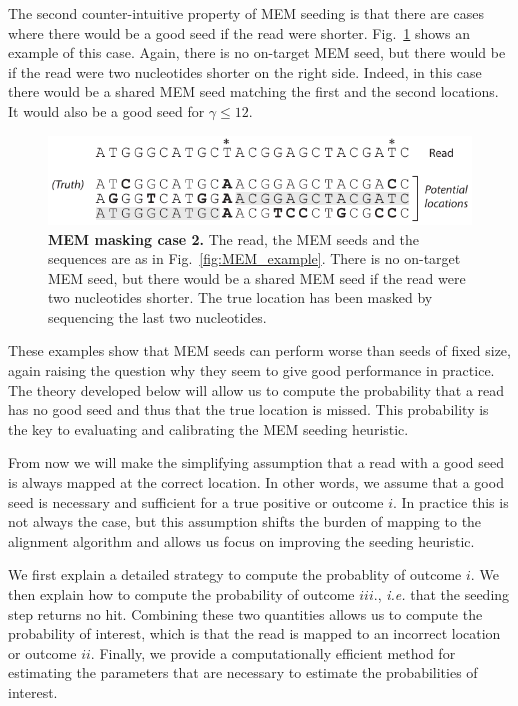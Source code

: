 \documentclass{article}
\begin{document}
The second counter-intuitive property of MEM seeding is that there are
cases where there would be a good seed if the read were shorter.
Fig.~\ref{fig:short_vs_long} shows an example of this case. Again, there
is no on-target MEM seed, but there would be if the read were two
nucleotides shorter on the right side. Indeed, in this case there would be
a shared MEM seed matching the first and the second locations. It would
also be a good seed for $\gamma \leq 12$.


\begin{figure}[h]
\centering
\includegraphics[scale=1]{short_vs_long_example.pdf}
\caption{\textbf{MEM masking case 2.}
The read, the MEM seeds and the sequences are as in
Fig.~\ref{fig:MEM_example}. There is no on-target MEM seed, but there
would be a shared MEM seed if the read were two nucleotides shorter. The
true location has been masked by sequencing the last two nucleotides.}
\label{fig:short_vs_long}
\end{figure}

These examples show that MEM seeds can perform worse than seeds of fixed
size, again raising the question why they seem to give good performance in
practice. The theory developed below will allow us to compute the
probability that a read has no good seed and thus that the true location
is missed. This probability is the key to evaluating and calibrating the
MEM seeding heuristic.

From now we will make the simplifying assumption that a read with a good
seed is always mapped at the correct location. In other words, we assume
that a good seed is necessary and sufficient for a true positive or
outcome $i.$ In practice this is not always the case, but this assumption
shifts the burden of mapping to the alignment algorithm and allows us
focus on improving the seeding heuristic.

We first explain a detailed strategy to compute the probablity of outcome
$i.$ We then explain how to compute the probability of outcome $iii.$,
\textit{i.e.} that the seeding step returns no hit. Combining these two
quantities allows us to compute the probability of interest, which is that
the read is mapped to an incorrect location or outcome $ii.$ Finally, we
provide a computationally efficient method for estimating the parameters
that are necessary to estimate the probabilities of interest.
\end{document}
